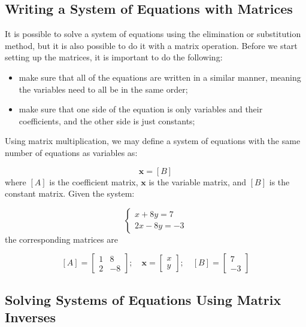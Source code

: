 \subsection{Writing a System of Equations with Matrices}\label{writing-a-system-of-equations-with-matrices}

It is possible to solve a system of equations using the elimination or
substitution method, but it is also possible to do it with a matrix
operation. Before we start setting up the matrices, it is important to
do the following:

\begin{itemize}
\tightlist
\item
  make sure that all of the equations are written in a similar manner,
  meaning the variables need to all be in the same order;
\item
  make sure that one side of the equation is only variables and their
  coefficients, and the other side is just constants;
\end{itemize}

Using matrix multiplication, we may define a
system of equations with the same number of equations as variables as:

\begin{equation} 
[A]\mathbf{x} = [B]
\end{equation}
where \([A]\) is the coefficient matrix, \(\mathbf{x}\) is the variable matrix, and \([B]\) is the constant matrix. Given the system:

\[
\begin{cases}
x + 8y = 7 \\
2x -8y = -3
\end{cases}
\]
the corresponding matrices are

\[[A]=
\begin{bmatrix}
1 & 8\\
2 & -8
\end{bmatrix}
;\quad
\mathbf{x}=
\begin{bmatrix}
x\\
y
\end{bmatrix}
;\quad
[B]=
\begin{bmatrix}
7\\
-3
\end{bmatrix}
\]

\subsection{Solving Systems of Equations Using Matrix Inverses}\label{solving-systems-of-equations-using-matrix-inverses}

